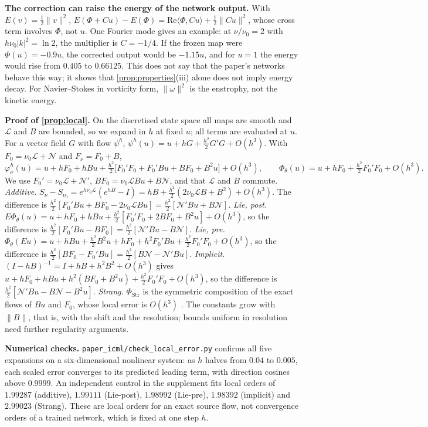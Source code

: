 \documentclass{article}
\theoremstyle{plain}
\newcommand{\N}{\mathcal{N}}
\newcommand{\Lop}{\mathcal{L}}
\begin{document}
\textbf{The correction can raise the energy of the network output.}
With $E(v)=\tfrac12\|v\|^2$, $E(\Phi+Cu)-E(\Phi)=\mathrm{Re}\langle\Phi,Cu\rangle+\tfrac12\|Cu\|^2$, whose cross term involves $\Phi$, not $u$. One Fourier mode gives an example: at $\nu/\nu_0=2$ with $h\nu_0|k|^2=\ln2$, the multiplier is $C=-1/4$. If the frozen map were $\Phi(u)=-0.9u$, the corrected output would be $-1.15u$, and for $u=1$ the energy would rise from $0.405$ to $0.66125$. This does not say that the paper's networks behave this way; it shows that \cref{prop:properties}(iii) alone does not imply energy decay. For Navier--Stokes in vorticity form, $\|\omega\|^2$ is the enstrophy, not the kinetic energy.

\textbf{Proof of \cref{prop:local}.}
On the discretised state space all maps are smooth and $\Lop$ and $B$ are bounded, so we expand in $h$ at fixed $u$; all terms are evaluated at $u$. For a vector field $G$ with flow $\psi^h$, $\psi^h(u)=u+hG+\tfrac{h^2}{2}G'G+O(h^3)$. With $F_0=\nu_0\Lop+\N$ and $F_\nu=F_0+B$,
\begin{equation*}
\varphi^h_\nu(u)=u+hF_0+hBu+\tfrac{h^2}{2}\big[F_0'F_0+F_0'Bu+BF_0+B^2u\big]+O(h^3),\qquad
\Phi_\theta(u)=u+hF_0+\tfrac{h^2}{2}F_0'F_0+O(h^3).
\end{equation*}
We use $F_0'=\nu_0\Lop+\N'$, $BF_0=\nu_0\Lop Bu+B\N$, and that $\Lop$ and $B$ commute.
\emph{Additive.} $S_\nu-S_{\nu_0}=e^{h\nu_0\Lop}(e^{hB}-I)=hB+\tfrac{h^2}{2}(2\nu_0\Lop B+B^2)+O(h^3)$. The difference is $\tfrac{h^2}{2}[F_0'Bu+BF_0-2\nu_0\Lop Bu]=\tfrac{h^2}{2}[\N'Bu+B\N]$.
\emph{Lie, post.} $E\Phi_\theta(u)=u+hF_0+hBu+\tfrac{h^2}{2}[F_0'F_0+2BF_0+B^2u]+O(h^3)$, so the difference is $\tfrac{h^2}{2}[F_0'Bu-BF_0]=\tfrac{h^2}{2}[\N'Bu-B\N]$.
\emph{Lie, pre.} $\Phi_\theta(Eu)=u+hBu+\tfrac{h^2}{2}B^2u+hF_0+h^2F_0'Bu+\tfrac{h^2}{2}F_0'F_0+O(h^3)$, so the difference is $\tfrac{h^2}{2}[BF_0-F_0'Bu]=\tfrac{h^2}{2}[B\N-\N'Bu]$.
\emph{Implicit.} $(I-hB)^{-1}=I+hB+h^2B^2+O(h^3)$ gives $u+hF_0+hBu+h^2(BF_0+B^2u)+\tfrac{h^2}{2}F_0'F_0+O(h^3)$, so the difference is $\tfrac{h^2}{2}[\N'Bu-B\N-B^2u]$.
\emph{Strang.} $\Phi_{\mathrm{Str}}$ is the symmetric composition of the exact flows of $Bu$ and $F_0$, whose local error is $O(h^3)$ \citep{strang1968construction,mclachlan2002splitting}.
The constants grow with $\|B\|$, that is, with the shift and the resolution; bounds uniform in resolution need further regularity arguments.

\textbf{Numerical checks.}
\texttt{paper\_icml/check\_local\_error.py} confirms all five expansions on a six-dimensional nonlinear system: as $h$ halves from $0.04$ to $0.005$, each scaled error converges to its predicted leading term, with direction cosines above $0.9999$. An independent control in the supplement fits local orders of $1.99287$ (additive), $1.99111$ (Lie-post), $1.98992$ (Lie-pre), $1.98392$ (implicit) and $2.99023$ (Strang). These are local orders for an exact source flow, not convergence orders of a trained network, which is fixed at one step $h$.
\end{document}

